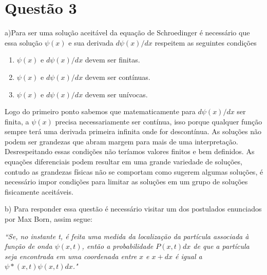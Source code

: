 \documentclass{article}
\begin{document}
\section {Questão 3}
a)Para ser uma solução aceitável da equação de Schroedinger é necessário que essa solução $\psi(x)$ e sua derivada $d\psi(x)/dx$ respeitem as seguintes condições
\begin{enumerate}
  \item $\psi(x)$  e $d\psi(x)/dx$ devem ser finitas.
  \item $\psi(x)$  e $d\psi(x)/dx$ devem ser contínuas.
  \item $\psi(x)$  e $d\psi(x)/dx$ devem ser unívocas.
\end{enumerate}
Logo do primeiro ponto sabemos que matematicamente para $d\psi(x)/dx$ ser finita, a $\psi(x)$ precisa necessariamente ser contínua, isso porque qualquer função sempre terá uma derivada primeira infinita onde for descontínua. As soluções não podem ser grandezas que abram margem para mais de uma interpretação. Desrespeitando essas condições não teríamos valores finitos e bem definidos. As equações diferenciais podem resultar em uma grande variedade de soluções, contudo as grandezas físicas não se comportam como sugerem algumas soluções, é necessário impor condições para limitar as soluções em um grupo de soluções fisicamente aceitáveis.\hfill \break

b) 
Para responder essa questão é necessário visitar um dos postulados enunciados por Max Born, assim segue:\hfill \break

\textit{
``Se, no instante t, é feita uma medida da localização da partícula associada à função de onda $\psi(x,t)$, então a probabilidade $P(x,t)dx$ de que a partícula seja encontrada em uma coordenada entre $x$ e $x + dx$ é igual a $\psi*(x,t)\psi(x,t)dx$."}
\hfill \break
\end{document}
